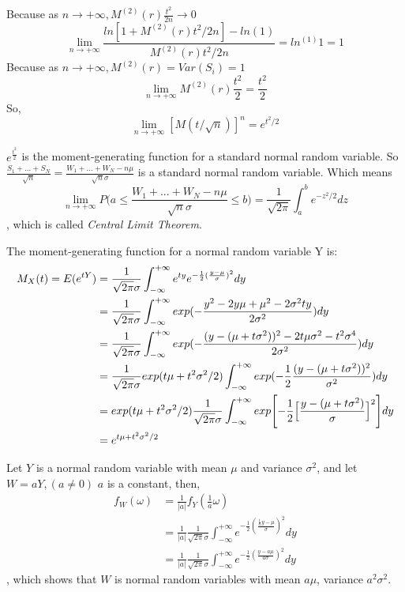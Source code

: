 \documentclass[
]{article}
\begin{document}
Because as \(n\to+\infty,M^{(2)}(r)\frac{t^2}{2n}\to0\)
\[\lim_{n\to+\infty}\frac{ln[1+M^{(2)}(r)t^2/2n]-ln(1)}{M^{(2)}(r)t^2/2n}=ln^{(1)}1=1\]
Because as \(n\to+\infty,M^{(2)}(r)=Var(S_i)=1\)
\[\lim_{n\to+\infty}M^{(2)}(r)\frac{t^2}{2}=\frac{t^2}{2}\] So,
\[\lim_{n\to+\infty}[M(t/\sqrt{n})]^n=e^{t^2/2}\]

\(e^{\frac{t^2}{2}}\) is the moment-generating function for a standard
normal random variable. So
\(\frac{S_1+...+S_N}{\sqrt{n}}=\frac{W_1+...+W_N-n\mu}{\sqrt{n}\sigma}\)
is a standard normal random variable. Which means
\[\lim_{n\to+\infty}P\Biggl(a\le\frac{W_1+...+W_N-n\mu}{\sqrt{n}\sigma} \le b\Biggl)=\frac{1}{\sqrt{2\pi}}\int_{a}^{b} e^{-z^2/2}dz\]
, which is called \emph{Central Limit Theorem}.

The moment-generating function for a normal random variable Y is:
\[\begin{align}
M_X(t)=E(e^{tY})&=\frac{1}{\sqrt{2\pi}\sigma}\int_{-\infty}^{+\infty}e^{ty} e^{-\frac{1}{2}(\frac{y-\mu}{\sigma})^2}dy\\
&=\frac{1}{\sqrt{2\pi}\sigma}\int_{-\infty}^{+\infty}exp(-\frac{y^2-2y\mu+\mu^2-2\sigma^2ty}{2\sigma^2})dy\\
&=\frac{1}{\sqrt{2\pi}\sigma}\int_{-\infty}^{+\infty}exp(-\frac{(y-(\mu+t\sigma^2))^2-2t\mu\sigma^2-t^2\sigma^4}{2\sigma^2})dy\\
&=\frac{1}{\sqrt{2\pi}\sigma}exp(t\mu+t^2\sigma^2/2)\int_{-\infty}^{+\infty}exp(-\frac{1}{2}\frac{(y-(\mu+t\sigma^2))^2}{\sigma^2})dy\\
&=exp(t\mu+t^2\sigma^2/2)\frac{1}{\sqrt{2\pi}\sigma}\int_{-\infty}^{+\infty}exp\Biggl[-\frac{1}{2}\Bigl[\frac{y-(\mu+t\sigma^2)}{\sigma}\Bigr]^2\Biggr]dy\\
&=e^{t\mu+t^2\sigma^2/2}
\end{align}\]

Let \(Y\) is a normal random variable with mean \(\mu\) and variance
\(\sigma^2\), and let \(W=aY,(a\ne0)\) \(a\) is a constant, then,\\
\[\begin{align}
f_W(\omega)&=\frac{1}{|a|}f_Y(\frac{1}{a}\omega)\\
&=\frac{1}{|a|}\frac{1}{\sqrt{2\pi}\sigma}\int_{-\infty}^{+\infty}e^{-\frac{1}{2}(\frac{\frac{1}{a}y-\mu}{\sigma})^2}dy\\
&=\frac{1}{|a|}\frac{1}{\sqrt{2\pi}\sigma}\int_{-\infty}^{+\infty}e^{-\frac{1}{2}(\frac{y-a\mu}{a\sigma})^2}dy
\end{align}\], which shows that \(W\) is normal random variables with
mean \(a\mu\), variance \(a^2\sigma^2\).
\end{document}
